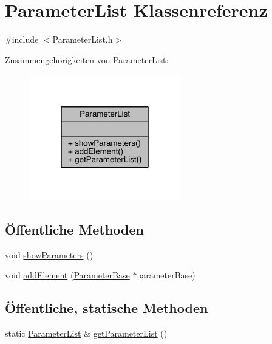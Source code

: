 \hypertarget{class_parameter_list}{}\section{Parameter\+List Klassenreferenz}
\label{class_parameter_list}


{\ttfamily \#include $<$Parameter\+List.\+h$>$}



Zusammengehörigkeiten von Parameter\+List\+:
\nopagebreak
\begin{figure}[H]
\begin{center}
\leavevmode
\includegraphics[width=187pt]{class_parameter_list__coll__graph}
\end{center}
\end{figure}
\subsection*{Öffentliche Methoden}
\begin{DoxyCompactItemize}
\item 
void \hyperlink{class_parameter_list_a8402f42970e27ac8618733f507178788}{show\+Parameters} ()
\item 
void \hyperlink{class_parameter_list_a4f4ede7252ae20641befa93cd6c316b3}{add\+Element} (\hyperlink{class_parameter_base}{Parameter\+Base} $\ast$parameter\+Base)
\end{DoxyCompactItemize}
\subsection*{Öffentliche, statische Methoden}
\begin{DoxyCompactItemize}
\item 
static \hyperlink{class_parameter_list}{Parameter\+List} \& \hyperlink{class_parameter_list_ae34f5f9c5a2c8cf9ea216cc733a0a68b}{get\+Parameter\+List} ()
\end{DoxyCompactItemize}


